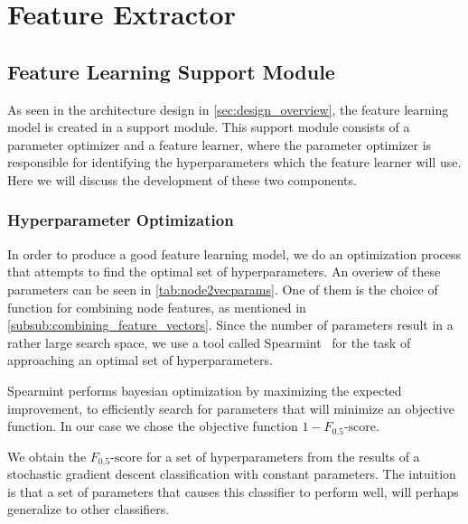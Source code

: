 \section{Feature Extractor}\label{feature_extractor}





\subsection{Feature Learning Support Module}
As seen in the architecture design in \cref{sec:design_overview}, the feature learning model is created in a support module. This support module consists of a parameter optimizer and a feature learner, where the parameter optimizer is responsible for identifying the hyperparameters which the feature learner will use. Here we will discuss the development of these two components.

\subsubsection{Hyperparameter Optimization}\label{sec:hyperopt}
In order to produce a good feature learning model, we do an optimization process that attempts to find the optimal set of hyperparameters. An overiew of these parameters can be seen in \cref{tab:node2vecparams}. One of them is the choice of function for combining node features, as mentioned in \cref{subsub:combining_feature_vectors}. Since the number of parameters result in a rather large search space, we use a tool called Spearmint~\cite{snoek2012practical} for the task of approaching an optimal set of hyperparameters.

Spearmint performs bayesian optimization by maximizing the expected improvement, to efficiently search for parameters that will minimize an objective function. In our case we chose the objective function $1- F_{0.5}\text{-score}$.

We obtain the $F_{0.5}\text{-score}$ for a set of hyperparameters from the results of a stochastic gradient descent classification with constant parameters. The intuition is that a set of parameters that causes this classifier to perform well, will perhaps generalize to other classifiers.

